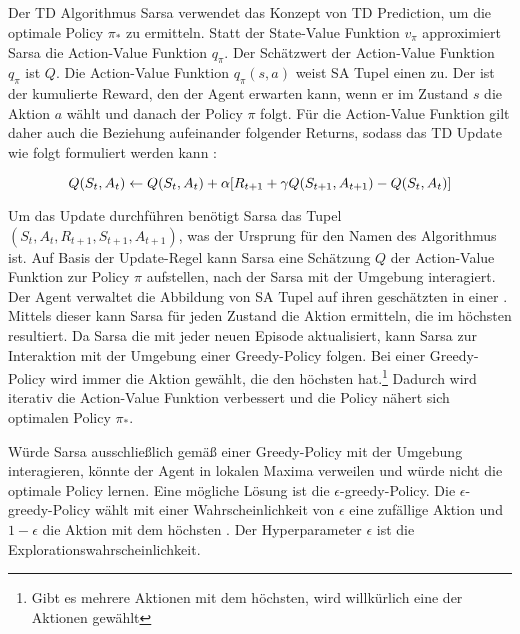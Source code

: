 \subsection{\sarsa}
Der \ac{TD} Algorithmus Sarsa verwendet das Konzept von \ac{TD} Prediction, um die optimale Policy $\pi_*$ zu ermitteln. 
Statt der State-Value Funktion $v_\pi$ approximiert Sarsa die Action-Value Funktion $q_\pi$. 
Der Schätzwert der Action-Value Funktion $q_\pi$ ist $Q$. \cite[S. S. 129]{suttonReinforcementLearningIntroduction2018}
Die Action-Value Funktion $q_\pi(s,a)$ weist \ac{SA Tupel} einen \qValue zu. 
Der \qValue ist der kumulierte Reward, den der Agent erwarten kann, wenn er im Zustand $s$ die Aktion $a$ wählt und danach der Policy $\pi$ folgt. 
Für die Action-Value Funktion gilt daher auch die Beziehung aufeinander folgender Returns, sodass das \ac{TD} Update wie folgt formuliert werden kann \cite[S. 129f.]{suttonReinforcementLearningIntroduction2018}:

\begin{equation}
    \label{eq:sarsa_update}
    \equationentry{TD Update Sarsa}
    Q(S_t,A_t) \leftarrow Q(S_t,A_t) +\alpha[R_{t+1} + \gamma Q(S_{t+1},A_{t+1})-Q(S_t,A_t)]
\end{equation}

Um das Update durchführen benötigt Sarsa das Tupel $(S_t,A_t,R_{t+1},S_{t+1},A_{t+1})$, was der Ursprung für den Namen des Algorithmus ist. 
Auf Basis der Update-Regel kann Sarsa eine Schätzung $Q$ der Action-Value Funktion zur Policy $\pi$ aufstellen, nach der Sarsa mit der Umgebung interagiert. \cite[S. 129f.]{suttonReinforcementLearningIntroduction2018}
Der Agent verwaltet die Abbildung von \ac{SA Tupel} auf ihren geschätzten \qValue in einer \qtable. 
Mittels dieser kann Sarsa für jeden Zustand die Aktion ermitteln, die im höchsten \qValue resultiert.
Da Sarsa die \qValues mit jeder neuen Episode aktualisiert, kann Sarsa zur Interaktion mit der Umgebung einer Greedy-Policy folgen.
Bei einer Greedy-Policy wird immer die Aktion gewählt, die den höchsten \qValue hat.\footnote{Gibt es mehrere Aktionen mit dem höchsten\qValue, wird willkürlich eine der Aktionen gewählt}
Dadurch wird iterativ die Action-Value Funktion verbessert und die Policy nähert sich optimalen Policy $\pi_*$. \cite[S. 129f.]{suttonReinforcementLearningIntroduction2018}

Würde Sarsa ausschließlich gemäß einer Greedy-Policy mit der Umgebung interagieren, könnte der Agent in lokalen Maxima verweilen und würde nicht die optimale Policy lernen. 
Eine mögliche Lösung ist die $\epsilon$-greedy-Policy. 
Die $\epsilon$-greedy-Policy wählt mit einer Wahrscheinlichkeit von $\epsilon$ eine zufällige Aktion und $1-\epsilon$ die Aktion mit dem höchsten \qValue.
Der Hyperparameter $\epsilon$ ist die Explorationswahrscheinlichkeit. \cite[S. 28f.]{suttonReinforcementLearningIntroduction2018}

